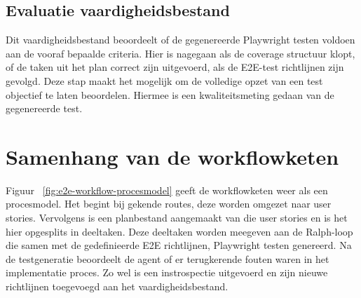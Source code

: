 \subsection{Evaluatie vaardigheidsbestand}
Dit vaardigheidsbestand beoordeelt of de gegenereerde Playwright testen voldoen aan de vooraf bepaalde criteria. Hier is nagegaan als de coverage structuur klopt, of de taken uit het plan correct zijn uitgevoerd, als de E2E-test richtlijnen zijn gevolgd. 
Deze stap maakt het mogelijk om de volledige opzet van een test objectief te laten beoordelen. Hiermee is een kwaliteitsmeting gedaan van de gegenereerde test.

\section{Samenhang van de workflowketen}

Figuur ~\ref{fig:e2e-workflow-procesmodel} geeft de workflowketen weer als een procesmodel. Het begint bij gekende routes, deze worden omgezet naar user stories. Vervolgens is een planbestand aangemaakt van die user stories en is het hier opgesplits in deeltaken. Deze deeltaken worden meegeven aan de Ralph-loop die samen met de gedefinieerde E2E richtlijnen, Playwright testen genereerd. Na de testgeneratie beoordeelt de agent of er terugkerende fouten waren in het implementatie proces. Zo wel is een instrospectie uitgevoerd en zijn nieuwe richtlijnen toegevoegd aan het vaardigheidsbestand.

